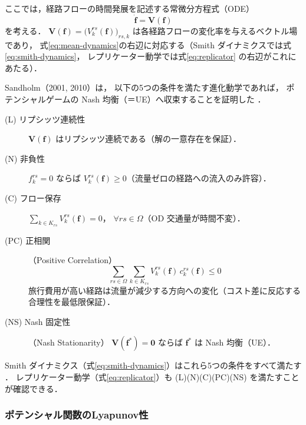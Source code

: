 ここでは，経路フローの時間発展を記述する常微分方程式（ODE）
\begin{equation}
  \dot{\boldsymbol{f}} = \boldsymbol{V}(\boldsymbol{f})
  \label{eq:evolutionary-dynamics-ode}
\end{equation}
を考える．
$\boldsymbol{V}(\boldsymbol{f}) = \bigl(V_k^{rs}(\boldsymbol{f})\bigr)_{rs,k}$
は各経路フローの変化率を与えるベクトル場であり，
式\eqref{eq:mean-dynamics}の右辺に対応する（Smith ダイナミクスでは式\eqref{eq:smith-dynamics}，
レプリケーター動学では式\eqref{eq:replicator} の右辺がこれにあたる）．

Sandholm（2001, 2010）は，
以下の5つの条件を満たす進化動学であれば，
ポテンシャルゲームの Nash 均衡（＝UE）へ収束することを証明した
\cite{Sandholm2001,Sandholm2010}．

\begin{description}
  \item[(L) リプシッツ連続性]
    $\boldsymbol{V}(\boldsymbol{f})$ はリプシッツ連続である（解の一意存在を保証）．

  \item[(N) 非負性]
    $f_k^{rs} = 0$ ならば $V_k^{rs}(\boldsymbol{f}) \geq 0$（流量ゼロの経路への流入のみ許容）．

  \item[(C) フロー保存]
    $\displaystyle\sum_{k \in K_{rs}} V_k^{rs}(\boldsymbol{f}) = 0$，
    $\forall rs \in \Omega$（OD 交通量が時間不変）．

  \item[(PC) 正相関]（Positive Correlation）
    \begin{equation}
      \sum_{rs \in \Omega} \sum_{k \in K_{rs}}
      V_k^{rs}(\boldsymbol{f})\, c_k^{rs}(\boldsymbol{f}) \leq 0
      \label{eq:positive-correlation}
    \end{equation}
    旅行費用が高い経路は流量が減少する方向への変化（コスト差に反応する合理性を最低限保証）．

  \item[(NS) Nash 固定性]（Nash Stationarity）
    $\boldsymbol{V}(\boldsymbol{f}^*) = \boldsymbol{0}$ ならば $\boldsymbol{f}^*$ は Nash 均衡（UE）．
\end{description}

Smith ダイナミクス（式\eqref{eq:smith-dynamics}）はこれら5つの条件をすべて満たす
\cite{Smith1984,Sandholm2010}．
レプリケーター動学（式\eqref{eq:replicator}）も (L)(N)(C)(PC)(NS) を満たすことが確認できる．

\subsubsection*{ポテンシャル関数のLyapunov性}

